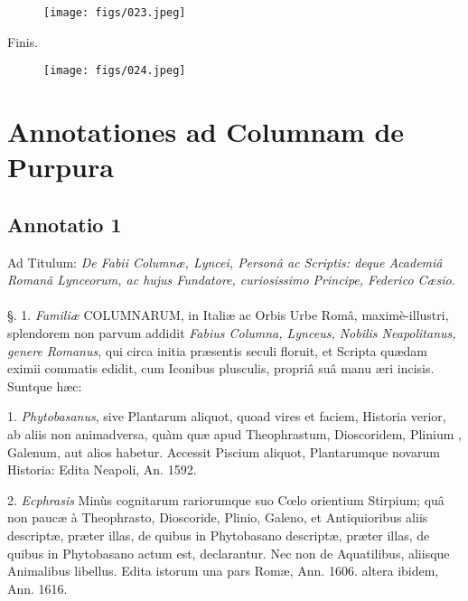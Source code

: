 \documentclass[a4paper, 11pt, oneside, polutonikogreek, german]{article}
\begin{document}
\begin{figure}[H]
\centering
\texttt{[image: figs/023.jpeg]}

\end{figure}
\begin{center}
Finis.
\end{center}
\begin{figure}[H]
\centering
\texttt{[image: figs/024.jpeg]}

\end{figure}
\clearpage
\section{Annotationes ad Columnam de Purpura}

\subsection{Annotatio 1}
\begin{center}
Ad Titulum: \emph{De Fabii Columnæ, Lyncei, Personâ ac Scriptis: deque Academiâ Romanâ Lynceorum, ac hujus Fundatore, curiosissimo Principe, Federico Cæsio}.
\end{center}
\paragraph{}
§. 1. \emph{Familiæ} COLUMNARUM, in Italiæ ac Orbis Urbe Româ, maximè-illustri, splendorem non parvum addidit \emph{Fabius Columna, Lynceus, Nobilis Neapolitanus, genere Romanus}, qui circa initia præsentis seculi floruit, et Scripta quædam eximii commatis edidit, cum Iconibus plusculis, propriâ suâ manu æri incisis. Suntque hæc:

1. \emph{Phytobasanus}, sive Plantarum aliquot, quoad vires et faciem, Historia verior, ab aliis non animadversa, quàm quæ apud Theophrastum, Dioscoridem, Plinium , Galenum, aut alios habetur. Accessit Piscium aliquot, Plantarumque novarum Historia: Edita Neapoli, An. 1592.

2. \emph{Ecphrasis} Minùs cognitarum rariorumque suo Cœlo orientium Stirpium; quâ non paucæ à Theophrasto, Dioscoride, Plinio, Galeno, et Antiquioribus aliis descriptæ, præter illas, de quibus in Phytobasano descriptæ, præter illas, de quibus in Phytobasano actum est, declarantur. Nec non de Aquatilibus, aliisque Animalibus libellus. Edita istorum una pars Romæ, Ann. 1606. altera ibidem, Ann. 1616.
\end{document}
